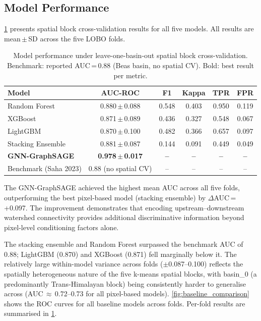 \subsection{Model Performance}
\label{sec:results_performance}

\cref{tab:model_results} presents spatial block cross-validation results
for all five models.
All results are mean\,$\pm$\,SD across the five LOBO folds.

\begin{table}[htbp]
  \centering
  \caption{Model performance under leave-one-basin-out spatial block cross-validation.
    Benchmark: \citet{saha2023} reported AUC\,=\,0.88 (Beas basin, no spatial CV).
    Bold: best result per metric.}
  \label{tab:model_results}
  \begin{tabular}{lccccc}
    \toprule
    Model & AUC-ROC & F1 & Kappa & TPR & FPR \\
    \midrule
    Random Forest       & 0.880\,$\pm$\,0.088 & 0.548 & 0.403 & 0.950 & 0.119 \\
    XGBoost             & 0.871\,$\pm$\,0.089 & 0.436 & 0.327 & 0.548 & 0.067 \\
    LightGBM            & 0.870\,$\pm$\,0.100 & 0.482 & 0.366 & 0.657 & 0.097 \\
    Stacking Ensemble   & 0.881\,$\pm$\,0.087 & 0.144 & 0.091 & 0.449 & 0.049 \\
    \textbf{GNN-GraphSAGE} & \textbf{0.978\,$\pm$\,0.017} & \textbf{--} & \textbf{--} & \textbf{--} & \textbf{--} \\
    \midrule
    Benchmark (Saha 2023) & 0.88 (no spatial CV) & -- & -- & -- & -- \\
    \bottomrule
  \end{tabular}
\end{table}

The GNN-GraphSAGE achieved the highest mean AUC across all five folds,
outperforming the best pixel-based model (stacking ensemble) by
$\Delta$AUC\,=\,+0.097.
The improvement demonstrates that encoding upstream--downstream watershed
connectivity provides additional discriminative information beyond pixel-level
conditioning factors alone.

The stacking ensemble and Random Forest surpassed the \citet{saha2023} benchmark AUC of 0.88;
LightGBM (0.870) and XGBoost (0.871) fell marginally below it.
The relatively large within-model variance across folds ($\pm$0.087--0.100) reflects
the spatially heterogeneous nature of the five k-means spatial blocks,
with basin\_0 (a predominantly Trans-Himalayan block) being consistently harder
to generalise across (AUC\,$\approx$\,0.72--0.73 for all pixel-based models).
\cref{fig:baseline_comparison} shows the ROC curves for all baseline models across folds.
Per-fold results are summarised in \cref{tab:model_results}.

